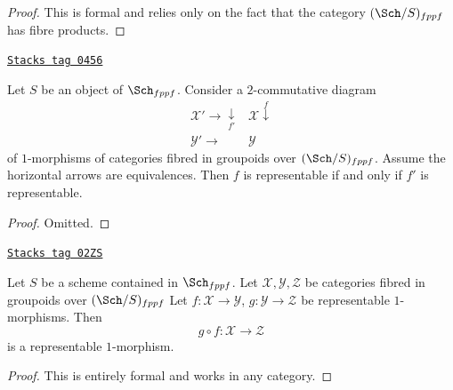 \begin{proof}
This is formal and relies only on the fact that
the category $(\Sch/S)_{fppf}$ has fibre products.
\end{proof}

\begin{lemma}
\label{algebraic-lemma-representable-morphism-equivalent}
\href{https://stacks.math.columbia.edu/tag/0456}{\texttt{Stacks tag 0456}}

Let $S$ be an object of $\Sch_{fppf}$.
Consider a $2$-commutative diagram
$$
\begin{array}{cc}\mathcal{X}' \longrightarrow\underset{f'}{\downarrow} & \mathcal{X} \overset{f}{\downarrow} \\ \mathcal{Y}' \longrightarrow & \mathcal{Y}\end{array}
$$
of $1$-morphisms of categories fibred in groupoids over
$(\Sch/S)_{fppf}$.
Assume the horizontal arrows are equivalences.
Then $f$ is representable if and only if $f'$ is representable.
\end{lemma}

\begin{proof}
Omitted.
\end{proof}

\begin{lemma}
\label{algebraic-lemma-composition-representable-transformations}
\href{https://stacks.math.columbia.edu/tag/02ZS}{\texttt{Stacks tag 02ZS}}

Let $S$ be a scheme contained in $\Sch_{fppf}$.
Let $\mathcal{X}, \mathcal{Y}, \mathcal{Z}$
be categories fibred in groupoids over $(\Sch/S)_{fppf}$
Let $f : \mathcal{X} \to \mathcal{Y}$, $g : \mathcal{Y} \to \mathcal{Z}$
be representable $1$-morphisms. Then
$$
g \circ f : \mathcal{X} \longrightarrow \mathcal{Z}
$$
is a representable $1$-morphism.
\end{lemma}

\begin{proof}
This is entirely formal and works in any category.
\end{proof}

